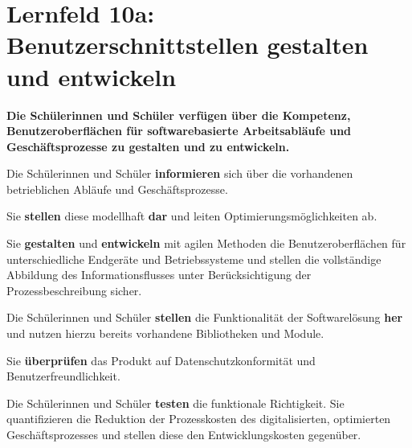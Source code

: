 \chapter{Lernfeld 10a: Benutzerschnittstellen gestalten und entwickeln}

\textbf{Die Schülerinnen und Schüler verfügen über die Kompetenz, Benutzeroberflächen für
softwarebasierte Arbeitsabläufe und Geschäftsprozesse zu gestalten und zu entwickeln.}

Die Schülerinnen und Schüler \textbf{informieren} sich über die vorhandenen betrieblichen Abläufe
und Geschäftsprozesse.

Sie \textbf{stellen} diese modellhaft \textbf{dar} und leiten Optimierungsmöglichkeiten ab.

Sie \textbf{gestalten} und \textbf{entwickeln} mit agilen Methoden die Benutzeroberflächen für unterschiedliche Endgeräte und Betriebssysteme und stellen die vollständige Abbildung des Informationsflusses unter Berücksichtigung der Prozessbeschreibung sicher.

Die Schülerinnen und Schüler \textbf{stellen} die Funktionalität der Softwarelösung \textbf{her} und nutzen
hierzu bereits vorhandene Bibliotheken und Module.

Sie \textbf{überprüfen} das Produkt auf Datenschutzkonformität und Benutzerfreundlichkeit.

Die Schülerinnen und Schüler \textbf{testen} die funktionale Richtigkeit. Sie quantifizieren die Reduktion der Prozesskosten des digitalisierten, optimierten Geschäftsprozesses und stellen
diese den Entwicklungskosten gegenüber. 